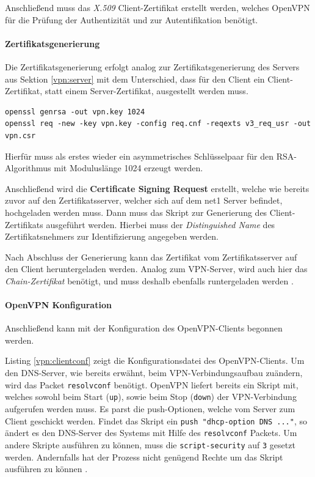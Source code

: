 Anschließend muss das \emph{X.509} Client-Zertifikat erstellt werden, welches OpenVPN für die Prüfung der Authentizität und zur Autentifikation benötigt.

\paragraph{Zertifikatsgenerierung}

Die Zertifikatsgenerierung erfolgt analog zur Zertifikatsgenerierung des Servers aus Sektion \ref{vpn:server} mit dem Unterschied, dass für den Client ein Client-Zertifikat, statt einem Server-Zertifikat, ausgestellt werden muss.


\begin{lstlisting}
openssl genrsa -out vpn.key 1024
openssl req -new -key vpn.key -config req.cnf -reqexts v3_req_usr -out vpn.csr
\end{lstlisting}

Hierfür muss als erstes wieder ein asymmetrisches Schlüsselpaar für den RSA-Algorithmus mit Moduluslänge 1024 erzeugt werden.

Anschließend wird die \textbf{Certificate Signing Request} erstellt, welche wie bereits zuvor auf den Zertifikatsserver, welcher sich auf dem net1 Server befindet, hochgeladen werden muss. Dann muss das Skript zur Generierung des Client-Zertifikats ausgeführt werden. Hierbei muss der \emph{Distinguished Name} des Zertifikatsnehmers zur Identifizierung angegeben werden.

Nach Abschluss der Generierung kann das Zertifikat vom Zertifikatsserver auf den Client heruntergeladen werden. Analog zum VPN-Server, wird auch hier das \emph{Chain-Zertifikat} benötigt, und muss deshalb ebenfalls runtergeladen werden  \cite{Neuschwander2014}.

\paragraph{OpenVPN Konfiguration}

Anschließend kann mit der Konfiguration des OpenVPN-Clients begonnen werden.



Listing \ref{vpn:clientconf} zeigt die Konfigurationsdatei des OpenVPN-Clients. Um den DNS-Server, wie bereits erwähnt, beim VPN-Verbindungsaufbau zuändern, wird das Packet \texttt{resolvconf} benötigt. OpenVPN liefert bereits ein Skript mit, welches sowohl beim Start (\texttt{up}), sowie beim Stop (\texttt{down}) der VPN-Verbindung aufgerufen werden muss. Es parst die push-Optionen, welche vom Server zum Client geschickt werden. Findet das Skript ein \texttt{push "dhcp-option DNS ..."}, so ändert es den DNS-Server des Systems mit Hilfe des \texttt{resolvconf} Packets. Um andere Skripte ausführen zu können, muss die \texttt{script-security} auf \texttt{3} gesetzt werden. Andernfalls hat der Prozess nicht genügend Rechte um das Skript ausführen zu können \cite{OpenVPN}.

